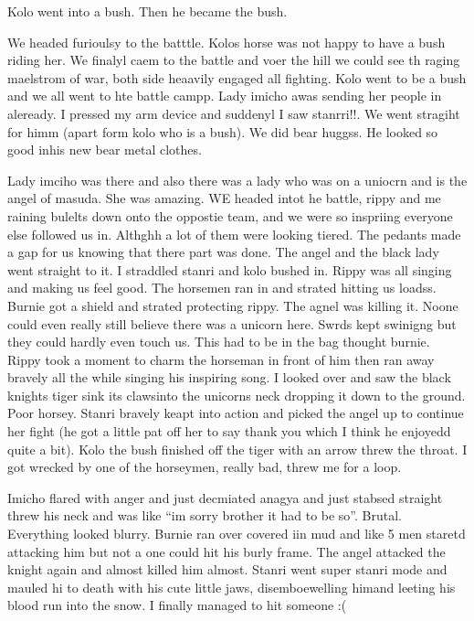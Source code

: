 Kolo went into a bush. Then he became the bush.\medskip

We headed furioulsy to the batttle. Kolos horse was not happy to have a bush riding her. We finalyl caem to the battle and voer the hill we could see th raging maelstrom of war, both side heaavily engaged all fighting. Kolo went to be a bush and we all went to hte battle campp. Lady imicho awas sending her people in aleready. I pressed my arm device and suddenyl I saw stanrri!!. We went stragiht for himm (apart form kolo who is a bush). We did bear huggss. He looked so good inhis new bear metal clothes.\medskip

Lady imciho was there and also there was a lady who was on a uniocrn and is the angel of masuda. She was amazing. WE headed intot he battle, rippy and me raining bulelts down onto the oppostie team, and we were so inspriing everyone else followed us in. Althghh a lot of them were looking tiered. The pedants made a gap for us knowing that there part was done. The angel and the black lady went straight to it. I straddled stanri and kolo bushed in. Rippy was all singing and making us feel good. The horsemen ran in and strated hitting us loadss. Burnie got a shield and strated protecting rippy. The agnel was killing it. Noone could even really still believe there was a unicorn here. Swrds kept swinigng but they could hardly even touch us. This had to be in the bag thought burnie. Rippy took a moment to charm the horseman in front of him then ran away bravely all the while singing his inspiring song. I looked over and saw the black knights tiger sink its clawsinto the unicorns neck dropping it down to the ground. Poor horsey. Stanri bravely keapt into action and picked the angel up to continue her fight (he got a little pat off her to say thank you which I think he enjoyedd quite a bit). Kolo the bush finished off the tiger with an arrow threw the throat. I got wrecked by one of the horseymen, really bad, threw me for a loop.\medskip

Imicho flared with anger and just decmiated anagya and just stabsed straight threw his neck and was like “im sorry brother it had to be so”. Brutal. Everything looked blurry. Burnie ran over covered iin mud and like 5 men staretd attacking him but not a one could hit his burly frame. The angel attacked the knight again and almost killed him almost. Stanri went super stanri mode and mauled hi to death with his cute little jaws, disemboewelling himand leeting his blood run into the snow. I finally managed to hit someone :(\medskip

